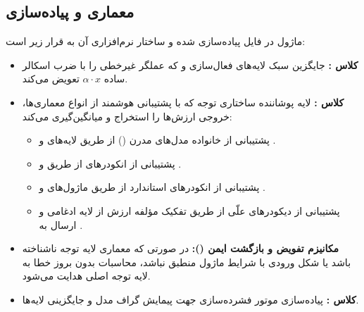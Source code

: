 \subsection{معماری و پیاده‌سازی}
ماژول در فایل  پیاده‌سازی شده و ساختار نرم‌افزاری آن به قرار زیر است:
\begin{itemize}
    \item \textbf{کلاس :} جایگزین سبک لایه‌های فعال‌سازی  و  که عملگر غیرخطی را با ضرب اسکالر ساده $\alpha \cdot x$ تعویض می‌کند.
    \item \textbf{کلاس :} لایه پوشاننده ساختاری توجه که با پشتیبانی هوشمند از انواع معماری‌ها، خروجی ارزش‌ها را استخراج و میانگین‌گیری می‌کند:
    \begin{itemize}
        \item پشتیبانی از خانواده مدل‌های مدرن () از طریق لایه‌های  و .
        \item پشتیبانی از انکودرهای  از طریق  و .
        \item پشتیبانی از انکودرهای استاندارد  از طریق ماژول‌های  و .
        \item پشتیبانی از دیکودرهای علّی  از طریق تفکیک مؤلفه ارزش از لایه ادغامی  و ارسال به .
    \end{itemize}
    \item \textbf{مکانیزم تفویض و بازگشت ایمن ():} در صورتی که معماری لایه توجه ناشناخته باشد یا شکل ورودی با شرایط ماژول منطبق نباشد، محاسبات بدون بروز خطا به لایه توجه اصلی هدایت می‌شود.
    \item \textbf{کلاس :} پیاده‌سازی موتور فشرده‌سازی جهت پیمایش گراف مدل و جایگزینی لایه‌ها.
\end{itemize}
